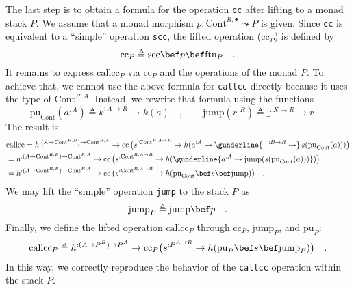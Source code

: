 The last step is to obtain a formula for the operation \lstinline!cc!
after lifting to a monad stack $P$. We assume that a monad morphism
$p:\text{Cont}^{R,\bullet}\leadsto P$ is given. Since \lstinline!cc!
is equivalent to a \textsf{``}simple\textsf{''} operation \lstinline!scc!, the lifted
operation ($\text{cc}_{P}$) is defined by
\[
\text{cc}_{P}\triangleq\text{scc}\bef p\bef\text{ftn}_{P}\quad.
\]
It remains to express $\text{callcc}_{P}$ via $\text{cc}_{P}$ and
the operations of the monad $P$. To achieve that, we cannot use the
above formula for \lstinline!callcc! directly because it uses the
type of $\text{Cont}^{R,A}$. Instead, we rewrite that formula using
the functions
\[
\text{pu}_{\text{Cont}}(a^{:A})\triangleq k^{:A\rightarrow R}\rightarrow k(a)\quad,\quad\quad\text{jump}(r^{:R})\triangleq\_^{:X\rightarrow R}\rightarrow r\quad.
\]
The result is
\begin{align*}
 & \text{callcc}=h^{:(A\rightarrow\text{Cont}^{R,B})\rightarrow\text{Cont}^{R,A}}\rightarrow\text{cc}\,\big(s^{:\text{Cont}^{R,A\rightarrow R}}\rightarrow h(a^{:A}\rightarrow\gunderline{\_^{:B\rightarrow R}\rightarrow}\,s(\text{pu}_{\text{Cont}}(a)))\big)\\
 & =h^{:(A\rightarrow\text{Cont}^{R,B})\rightarrow\text{Cont}^{R,A}}\rightarrow\text{cc}\,\big(s^{:\text{Cont}^{R,A\rightarrow R}}\rightarrow h(\gunderline{a^{:A}\rightarrow\text{jump}(s(\text{pu}_{\text{Cont}}(a)))})\big)\\
 & =h^{:(A\rightarrow\text{Cont}^{R,B})\rightarrow\text{Cont}^{R,A}}\rightarrow\text{cc}\,\big(s^{:\text{Cont}^{R,A\rightarrow R}}\rightarrow h(\text{pu}_{\text{Cont}}\bef s\bef\text{jump})\big)\quad.
\end{align*}
We may lift the \textsf{``}simple\textsf{''} operation \lstinline!jump! to the stack
$P$ as
\[
\text{jump}_{P}\triangleq\text{jump}\bef p\quad.
\]
Finally, we define the lifted operation $\text{callcc}_{P}$ through
$\text{cc}_{P}$, $\text{jump}_{P}$, and $\text{pu}_{P}$:
\[
\text{callcc}_{P}\triangleq h^{:(A\rightarrow P^{B})\rightarrow P^{A}}\rightarrow\text{cc}_{P}\big(s^{:P^{A\rightarrow R}}\rightarrow h(\text{pu}_{P}\bef s\bef\text{jump}_{P})\big)\quad.
\]
In this way, we correctly reproduce the behavior of the \lstinline!callcc!
operation within the stack $P$.

